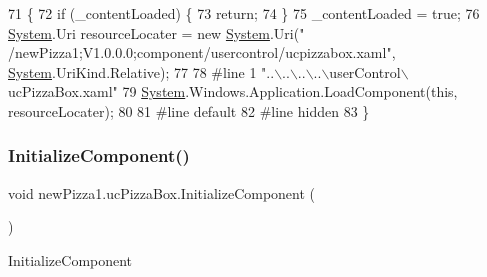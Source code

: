 \begin{DoxyCode}
71                                           \{
72             \textcolor{keywordflow}{if} (\_contentLoaded) \{
73                 \textcolor{keywordflow}{return};
74             \}
75             \_contentLoaded = \textcolor{keyword}{true};
76             \hyperlink{namespaceSystem}{System}.Uri resourceLocater = \textcolor{keyword}{new} \hyperlink{namespaceSystem}{System}.Uri(\textcolor{stringliteral}{"
      /newPizza1;V1.0.0.0;component/usercontrol/ucpizzabox.xaml"}, \hyperlink{namespaceSystem}{System}.UriKind.Relative);
77             
78 \textcolor{preprocessor}{            #line 1 "..\(\backslash\)..\(\backslash\)..\(\backslash\)..\(\backslash\)userControl\(\backslash\)ucPizzaBox.xaml"
}
79             \hyperlink{namespaceSystem}{System}.Windows.Application.LoadComponent(\textcolor{keyword}{this}, resourceLocater);
80             
81 \textcolor{preprocessor}{            #line default
}
82 \textcolor{preprocessor}{            #line hidden
}
83         \}
\end{DoxyCode}
\mbox{\label{classnewPizza1_1_1ucPizzaBox_a0bf3486ff05489987fc9b6766aec72d1}} 
\subsubsection{\texorpdfstring{Initialize\+Component()}{InitializeComponent()}\hspace{0.1cm}{\footnotesize\ttfamily [4/6]}}
{\footnotesize\ttfamily void new\+Pizza1.\+uc\+Pizza\+Box.\+Initialize\+Component (\begin{DoxyParamCaption}{ }\end{DoxyParamCaption})\hspace{0.3cm}{\ttfamily [inline]}}



Initialize\+Component 


